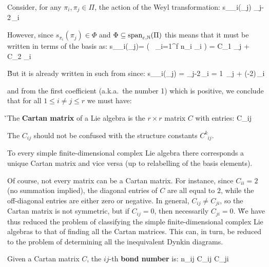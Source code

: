 Consider, for any $\pi_i,\pi_j\in \Pi$, the action of the Weyl transformation:
\bse
s_{\pi_i}(\pi_j) \coloneqq \pi_j-2\,\pi_i
\ese

However, since $s_{\pi_i}(\pi_j)\in\Phi$ and $\Phi\subseteq\operatorname{span}_{\varepsilon,\mathbb{N}} (\Pi)$ this means that it must be
written in terms of the basis as:
\bse
s_{\pi_i}(\pi_j)\in\Phi = \left( \varepsilon \, \sum_{i=1}^f n_i \pi_i \right ) = C_1 \pi_j + C_2 \pi_i
\ese

\v

But it is already written in such from since:
\bse
s_{\pi_i}(\pi_j) = \pi_j-2\,\pi_i = 1\, \pi_j
+ \left(-2\right)\,\pi_i
\ese

and from the first coefficient (a.k.a.\ the number 1) which is positive, we conclude that for all $1\leq i\neq j\leq r$
we must have:
\in \N
\ese

\v

The \textbf{Cartan matrix} of a Lie algebra is the $r\times r$ matrix $C$ with entries:
\bse
C_{ij} 
\ese
\ed

\vspace{2pt}

The $C_{ij}$ should not be confused with the structure constants $C^k_{\phantom{k}ij}$.

\bt[]
To every simple finite-dimensional complex Lie algebra there corresponds a unique Cartan matrix and vice versa (up to
relabelling of the basis elements).
\et

Of course, not every matrix can be a Cartan matrix. For instance, since $C_{ii}=2$ (no summation implied), the
diagonal entries of $C$ are all equal to $2$, while the off-diagonal entries are either zero or negative. In general,
$C_{ij} \neq C_{ji}$, so the Cartan matrix is not symmetric, but if $C_{ij}=0$, then necessarily $C_{ji}=0$. \v

We have thus reduced the problem of classifying the simple finite-dimensional complex Lie algebras to that of finding
all the Cartan matrices. This can, in turn, be reduced to the problem of determining all the inequivalent Dynkin
diagrams.

Given a Cartan matrix $C$, the $ij$-th \textbf{bond number} is:
\bse
n_{ij} \coloneqq C_{ij} C_{ji}
\ese
\ed

